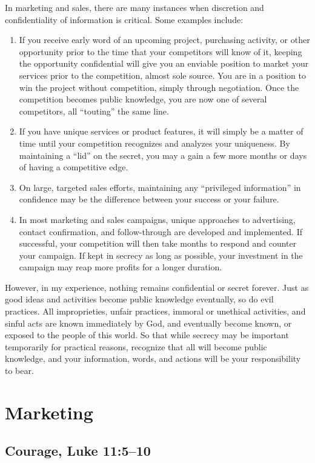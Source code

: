 \documentclass[12pt]{memoir}
\begin{document}
In marketing and sales, there are many instances when discretion and
confidentiality of information is critical. Some examples include:
\begin{enumerate}
\item If you receive early word of an upcoming project, purchasing activity,
or other opportunity prior to the time that your competitors will
know of it, keeping the opportunity confidential will give you an
enviable position to market your services prior to the competition,
almost sole source. You are in a position to win the project without
competition, simply through negotiation. Once the competition becomes
public knowledge, you are now one of several competitors, all ``touting''
the same line. 
\item If you have unique services or product features, it will simply be
a matter of time until your competition recognizes and analyzes your
uniqueness. By maintaining a ``lid'' on the secret, you may a gain
a few more months or days of having a competitive edge. 
\item On large, targeted sales efforts, maintaining any ``privileged information''
in confidence may be the difference between your success or your failure. 
\item In most marketing and sales campaigns, unique approaches to advertising,
contact confirmation, and follow-through are developed and implemented.
If successful, your competition will then take months to respond and
counter your campaign. If kept in secrecy as long as possible, your
investment in the campaign may reap more profits for a longer duration.
\end{enumerate}
However, in my experience, nothing remains confidential or secret
forever. Just as good ideas and activities become public knowledge
eventually, so do evil practices. All improprieties, unfair practices,
immoral or unethical activities, and sinful acts are known immediately
by God, and eventually become known, or exposed to the people of this
world. So that while secrecy may be important temporarily for practical
reasons, recognize that all will become public knowledge, and your
information, words, and actions will be your responsibility to bear.

\section{Marketing}

\subsection{Courage, Luke 11:5--10}
\end{document}
